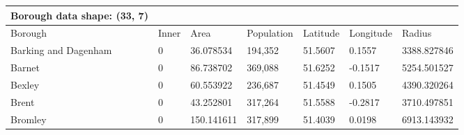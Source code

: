 \documentclass[11pt]{article}
\makeatletter
\newcommand{\boxspacing}{\kern\kvtcb@left@rule\kern\kvtcb@boxsep}
\newcommand{\prompt}[4]{
        \ttfamily\llap{{\color{#2}[#3]:\hspace{3pt}#4}}\vspace{-\baselineskip}
    }
\makeatother
\begin{document}
    \begin{tabular}{lllllll}
    Borough data shape: (33, 7)
    \\ \hline
    Borough & Inner &
    Area &
    Population &
    Latitude & Longitude &
    Radius
    \\ \hline
    Barking and Dagenham & 0 &
    36.078534 &
    194,352 &
    51.5607 & 0.1557 &
    3388.827846
    \\
    Barnet & 0 &
    86.738702 &
    369,088 &
    51.6252 & -0.1517 &
    5254.501527
    \\
    Bexley & 0 &
    60.553922 &
    236,687 & 
    51.4549 & 0.1505 &
    4390.320264
    \\
    Brent & 0 &
    43.252801 &
    317,264 &
    51.5588 & -0.2817 &
    3710.497851
    \\
    Bromley & 0 &
    150.141611 &
    317,899 &
    51.4039 & 0.0198 &
    6913.143932
    \end{tabular}



        
\end{document}
